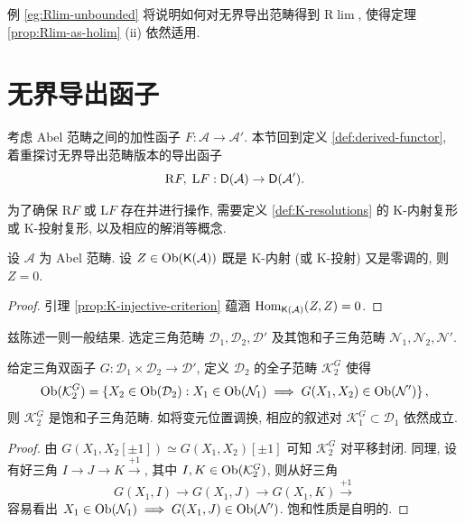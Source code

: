 例 \ref{eg:Rlim-unbounded} 将说明如何对无界导出范畴得到 $\mathrm{R}\lim$, 使得定理 \ref{prop:Rlim-as-holim} (ii) 依然适用.

\section{无界导出函子}\label{sec:unbounded-derived}
考虑 Abel 范畴之间的加性函子 $F: \mathcal{A} \to \mathcal{A}'$. 本节回到定义 \ref{def:derived-functor}, 着重探讨无界导出范畴版本的导出函子
\[ \mathrm{R}F, \; \mathrm{L}F: \mathsf{D}(\mathcal{A}) \to \mathsf{D}(\mathcal{A}'). \]

为了确保 $\mathrm{R}F$ 或 $\mathrm{L}F$ 存在并进行操作, 需要定义 \ref{def:K-resolutions} 的 K-内射复形或 K-投射复形, 以及相应的解消等概念.

\begin{lemma}\label{prop:K-injective-zero}
	设 $\mathcal{A}$ 为 Abel 范畴. 设 $Z \in \operatorname{Ob}(\mathsf{K}(\mathcal{A}))$ 既是 K-内射 (或 K-投射) 又是零调的, 则 $Z = 0$.
\end{lemma}
\begin{proof}
	引理 \ref{prop:K-injective-criterion} 蕴涵 $\operatorname{Hom}_{\mathsf{K}(\mathcal{A})}(Z, Z) = 0$.
\end{proof}

兹陈述一则一般结果. 选定三角范畴 $\mathcal{D}_1, \mathcal{D}_2, \mathcal{D}'$ 及其饱和子三角范畴 $\mathcal{N}_1, \mathcal{N}_2, \mathcal{N}'$.

\begin{lemma}\label{prop:K-cats}
	给定三角双函子 $G: \mathcal{D}_1 \times \mathcal{D}_2 \to \mathcal{D}'$, 定义 $\mathcal{D}_2$ 的全子范畴 $\mathcal{K}_2^G$ 使得
	\[ \operatorname{Ob}(\mathcal{K}_2^G) = \left\{ X_2 \in \operatorname{Ob}(\mathcal{D}_2) : X_1 \in \operatorname{Ob}(\mathcal{N}_1) \implies G(X_1, X_2) \in \operatorname{Ob}(\mathcal{N}') \right\}, \]
	则 $\mathcal{K}_2^G$ 是饱和子三角范畴. 如将变元位置调换, 相应的叙述对 $\mathcal{K}_1^G \subset \mathcal{D}_1$ 依然成立.
\end{lemma}
\begin{proof}
	由 $G(X_1, X_2[\pm 1]) \simeq G(X_1, X_2)[\pm 1]$ 可知 $\mathcal{K}_2^G$ 对平移封闭. 同理, 设有好三角 $I \to J \to K \xrightarrow{+1}$, 其中 $I, K \in \operatorname{Ob}(\mathcal{K}_2^G)$, 则从好三角
	\[ G(X_1, I) \to G(X_1, J) \to G(X_1, K) \xrightarrow{+1} \]
	容易看出 $X_1 \in \operatorname{Ob}(\mathcal{N}_1) \implies G(X_1, J) \in \operatorname{Ob}(\mathcal{N}')$. 饱和性质是自明的.
\end{proof}

